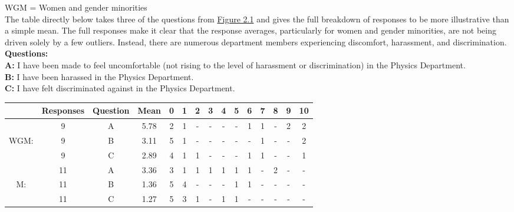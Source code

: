 \documentclass[oneside]{book}   %
\begin{document}
\noindent WGM = Women and gender minorities
\\


The table directly below takes three of the questions from \hyperlink{Fig 2.1}{Figure 2.1} and gives the full breakdown of responses to be more illustrative than a simple mean. The full responses make it clear that the response averages, particularly for women and gender minorities, are not being driven solely by a few outliers. Instead, there are numerous department members experiencing discomfort, harassment, and discrimination.\\

\noindent\textbf{Questions:}\\
\indent \textbf{A:} I have been made to feel uncomfortable (not rising to the level of harassment or discrimination) in the Physics Department.\\
\indent \textbf{B:} I have been harassed in the Physics Department.\\
\indent \textbf{C:} I have felt discriminated against in the Physics Department.\\

\noindent\begin{tabular}{cccc|ccccccccccc}
  & Responses & Question & Mean & 0 & 1 & 2 & 3 & 4 & 5 & 6 & 7 & 8 & 9 & 10\\
\hline
 & 9 & A & 5.78 & 2 & 1 & - & - & - & - & 1 & 1 & - & 2 & 2 \\
WGM: & 9 & B & 3.11 & 5 & 1 & - & - & - & - & - & 1 & - & - & 2 \\
 & 9 & C & 2.89 & 4 & 1 & 1 & - & - & - & 1 & 1 & - & - & 1 \\
\hline
 & 11 & A & 3.36 & 3 & 1 & 1 & 1 & 1 & 1 & 1 & - & 2 & - & - \\
M: & 11 & B & 1.36 & 5 & 4 & - & - & - & 1 & 1 & - & - & - & - \\
 & 11 & C & 1.27 & 5 & 3 & 1 & - & 1 & 1 & - & - & - & - & - \\
\hline
\end{tabular}
\\
\end{document}
